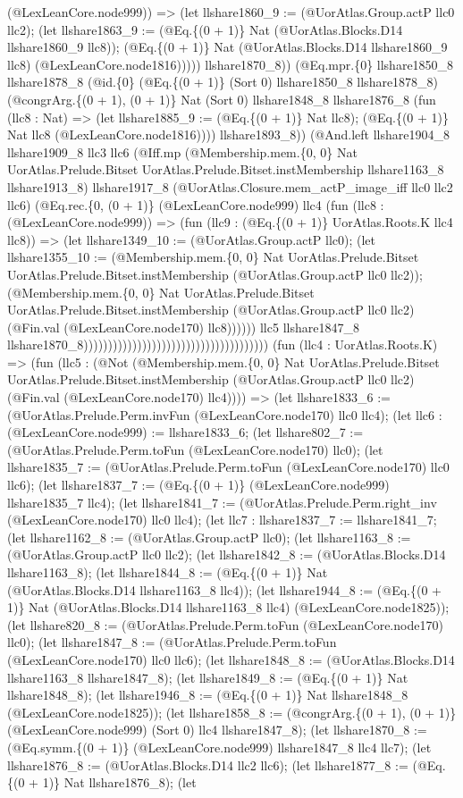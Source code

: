 \documentclass[11pt]{article}
\begin{document}
(@LexLeanCore.node999)) => (let llshare1860\_9 := (@UorAtlas.Group.actP llc0 llc2); (let llshare1863\_9 := (@Eq.\{(0 + 1)\} Nat (@UorAtlas.Blocks.D14 llshare1860\_9 llc8)); (@Eq.\{(0 + 1)\} Nat (@UorAtlas.Blocks.D14 llshare1860\_9 llc8) (@LexLeanCore.node1816))))) llshare1870\_8)) (@Eq.mpr.\{0\} llshare1850\_8 llshare1878\_8 (@id.\{0\} (@Eq.\{(0 + 1)\} (Sort 0) llshare1850\_8 llshare1878\_8) (@congrArg.\{(0 + 1), (0 + 1)\} Nat (Sort 0) llshare1848\_8 llshare1876\_8 (fun (llc8 : Nat) => (let llshare1885\_9 := (@Eq.\{(0 + 1)\} Nat llc8); (@Eq.\{(0 + 1)\} Nat llc8 (@LexLeanCore.node1816)))) llshare1893\_8)) (@And.left llshare1904\_8 llshare1909\_8 llc3 llc6 (@Iff.mp (@Membership.mem.\{0, 0\} Nat UorAtlas.Prelude.Bitset UorAtlas.Prelude.Bitset.instMembership llshare1163\_8 llshare1913\_8) llshare1917\_8 (@UorAtlas.Closure.mem\_actP\_image\_iff llc0 llc2 llc6) (@Eq.rec.\{0, (0 + 1)\} (@LexLeanCore.node999) llc4 (fun (llc8 : (@LexLeanCore.node999)) => (fun (llc9 : (@Eq.\{(0 + 1)\} UorAtlas.Roots.K llc4 llc8)) => (let llshare1349\_10 := (@UorAtlas.Group.actP llc0); (let llshare1355\_10 := (@Membership.mem.\{0, 0\} Nat UorAtlas.Prelude.Bitset UorAtlas.Prelude.Bitset.instMembership (@UorAtlas.Group.actP llc0 llc2)); (@Membership.mem.\{0, 0\} Nat UorAtlas.Prelude.Bitset UorAtlas.Prelude.Bitset.instMembership (@UorAtlas.Group.actP llc0 llc2) (@Fin.val (@LexLeanCore.node170) llc8)))))) llc5 llshare1847\_8 llshare1870\_8)))))))))))))))))))))))))))))))))))))) (fun (llc4 : UorAtlas.Roots.K) => (fun (llc5 : (@Not (@Membership.mem.\{0, 0\} Nat UorAtlas.Prelude.Bitset UorAtlas.Prelude.Bitset.instMembership (@UorAtlas.Group.actP llc0 llc2) (@Fin.val (@LexLeanCore.node170) llc4)))) => (let llshare1833\_6 := (@UorAtlas.Prelude.Perm.invFun (@LexLeanCore.node170) llc0 llc4); (let llc6 : (@LexLeanCore.node999) := llshare1833\_6; (let llshare802\_7 := (@UorAtlas.Prelude.Perm.toFun (@LexLeanCore.node170) llc0); (let llshare1835\_7 := (@UorAtlas.Prelude.Perm.toFun (@LexLeanCore.node170) llc0 llc6); (let llshare1837\_7 := (@Eq.\{(0 + 1)\} (@LexLeanCore.node999) llshare1835\_7 llc4); (let llshare1841\_7 := (@UorAtlas.Prelude.Perm.right\_inv (@LexLeanCore.node170) llc0 llc4); (let llc7 : llshare1837\_7 := llshare1841\_7; (let llshare1162\_8 := (@UorAtlas.Group.actP llc0); (let llshare1163\_8 := (@UorAtlas.Group.actP llc0 llc2); (let llshare1842\_8 := (@UorAtlas.Blocks.D14 llshare1163\_8); (let llshare1844\_8 := (@Eq.\{(0 + 1)\} Nat (@UorAtlas.Blocks.D14 llshare1163\_8 llc4)); (let llshare1944\_8 := (@Eq.\{(0 + 1)\} Nat (@UorAtlas.Blocks.D14 llshare1163\_8 llc4) (@LexLeanCore.node1825)); (let llshare820\_8 := (@UorAtlas.Prelude.Perm.toFun (@LexLeanCore.node170) llc0); (let llshare1847\_8 := (@UorAtlas.Prelude.Perm.toFun (@LexLeanCore.node170) llc0 llc6); (let llshare1848\_8 := (@UorAtlas.Blocks.D14 llshare1163\_8 llshare1847\_8); (let llshare1849\_8 := (@Eq.\{(0 + 1)\} Nat llshare1848\_8); (let llshare1946\_8 := (@Eq.\{(0 + 1)\} Nat llshare1848\_8 (@LexLeanCore.node1825)); (let llshare1858\_8 := (@congrArg.\{(0 + 1), (0 + 1)\} (@LexLeanCore.node999) (Sort 0) llc4 llshare1847\_8); (let llshare1870\_8 := (@Eq.symm.\{(0 + 1)\} (@LexLeanCore.node999) llshare1847\_8 llc4 llc7); (let llshare1876\_8 := (@UorAtlas.Blocks.D14 llc2 llc6); (let llshare1877\_8 := (@Eq.\{(0 + 1)\} Nat llshare1876\_8); (let 
\end{document}
